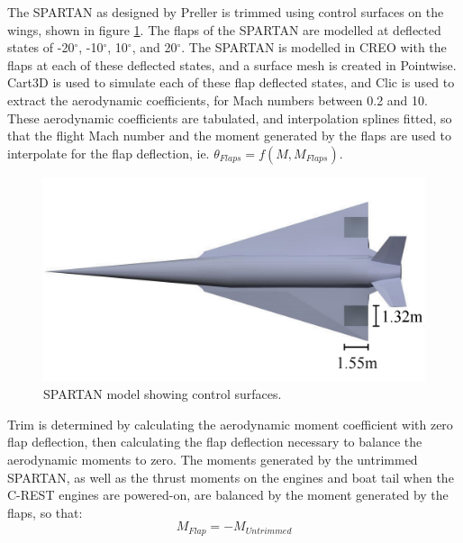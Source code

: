 		The SPARTAN as designed by Preller\cite{Preller2017b} is trimmed using control surfaces on the wings, shown in figure \ref{fig:SPARTAN_FLAPS}. 
		The flaps of the SPARTAN are modelled at deflected states of -20$^\circ$, -10$^\circ$, 10$^\circ$, and 20$^\circ$. The SPARTAN is modelled in CREO with the flaps at each of these deflected states, and a surface mesh is created in Pointwise. 
		Cart3D is used to simulate each of these flap deflected states, and Clic is used to extract the aerodynamic coefficients, for Mach numbers between 0.2 and 10. These aerodynamic coefficients are tabulated, and interpolation splines fitted, so that the flight Mach number and the moment generated by the flaps are used to interpolate for the flap deflection, ie. $\theta_{Flaps} = f(M,M_{Flaps})$.
		\begin{figure}[ht]
			\centering
			\includegraphics[width=0.6\linewidth]{figures/3_vehicle_design/SPARTAN_FLAPS}
			\caption{SPARTAN model showing control surfaces.}
			\label{fig:SPARTAN_FLAPS}
		\end{figure}
		Trim is determined by calculating the aerodynamic moment coefficient with zero flap deflection, then calculating the flap deflection necessary to balance the aerodynamic moments to zero. The moments generated by the untrimmed SPARTAN, as well as the thrust moments on the engines and boat tail when the C-REST engines are powered-on, are balanced by the moment generated by the flaps, so that:
		\begin{equation}
		M_{Flap} = -M_{Untrimmed}
		\end{equation}
		  
		
		 
		 
		

		
		
